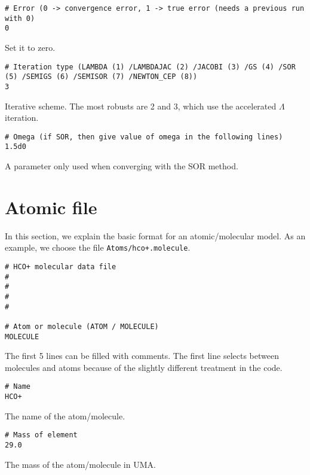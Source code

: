 \documentclass[12pt]{article}
\begin{document}
\begin{footnotesize} \begin{verbatim}
# Error (0 -> convergence error, 1 -> true error (needs a previous run with 0)
0
\end{verbatim} \end{footnotesize}
Set it to zero.

\begin{footnotesize} \begin{verbatim}
# Iteration type (LAMBDA (1) /LAMBDAJAC (2) /JACOBI (3) /GS (4) /SOR (5) /SEMIGS (6) /SEMISOR (7) /NEWTON_CEP (8))
3
\end{verbatim} \end{footnotesize}
Iterative scheme. The most robusts are 2 and 3, which use the accelerated $\Lambda$ iteration.

\begin{footnotesize} \begin{verbatim}
# Omega (if SOR, then give value of omega in the following lines)
1.5d0
\end{verbatim} \end{footnotesize}
A parameter only used when converging with the SOR method.

\section{Atomic file}
In this section, we explain the basic format for an atomic/molecular
model. As an example, we choose the file \texttt{Atoms/hco+.molecule}.
\begin{footnotesize} \begin{verbatim}
# HCO+ molecular data file
# 
# 
# 
# 

# Atom or molecule (ATOM / MOLECULE)
MOLECULE
\end{verbatim} \end{footnotesize}
The first 5 lines can be filled with comments. The first
line selects between molecules and atoms because of the
slightly different treatment in the code.

\begin{footnotesize} \begin{verbatim}
# Name
HCO+
\end{verbatim} \end{footnotesize}
The name of the atom/molecule.

\begin{footnotesize} \begin{verbatim}
# Mass of element 
29.0
\end{verbatim} \end{footnotesize}
The mass of the atom/molecule in UMA.
\end{document}
